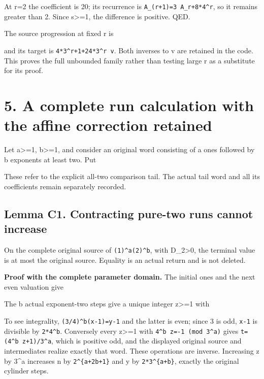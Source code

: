 
At r=2 the coefficient is 20; its recurrence is
\nolinkurl{A_(r+1)=3 A_r+8*4^r}, so it remains greater than 2. Since
s\textgreater=1, the difference is positive. QED.

The source progression at fixed r is


and its target is \nolinkurl{4*3^r+1+24*3^r v}. Both inverses to v are
retained in the code. This proves the full unbounded family rather than
testing large r as a substitute for its proof.

\section{5. A complete run calculation with the affine correction
retained}

Let a\textgreater=1, b\textgreater=1, and consider an original word
consisting of a ones followed by b exponents at least two. Put


These refer to the explicit all-two comparison tail. The actual tail
word and all its coefficients remain separately recorded.

\subsection{Lemma C1. Contracting pure-two runs cannot increase}

On the complete original source of \nolinkurl{(1)^a(2)^b}, with
D\_2\textgreater0, the terminal value is at most the original source.
Equality is an actual return and is not deleted.

\textbf{Proof with the complete parameter domain.} The initial ones and
the next even valuation give


The b actual exponent-two steps give a unique integer z\textgreater=1
with


To see integrality, \nolinkurl{(3/4)^b(x-1)=y-1} and the latter is even;
since 3 is odd, \nolinkurl{x-1} is divisible by \nolinkurl{2*4^b}.
Conversely every z\textgreater=1 with \nolinkurl{4^b z=-1 (mod 3^a)}
gives \nolinkurl{t=(4^b z+1)/3^a}, which is positive odd, and the
displayed original source and intermediates realize exactly that word.
These operations are inverse. Increasing z by 3\^{}a increases n by
\texttt{2\^{}\{a+2b+1\}} and y by \texttt{2*3\^{}\{a+b\}}, exactly the
original cylinder steps.

